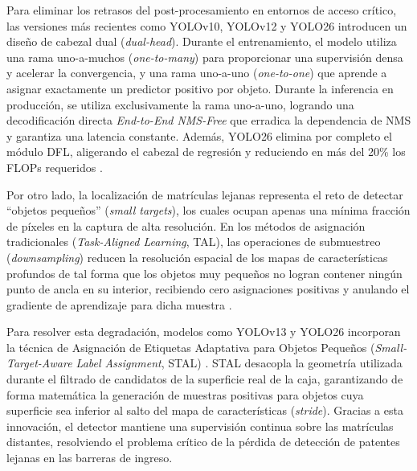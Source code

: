 Para eliminar los retrasos del post-procesamiento en entornos de acceso crítico,
las versiones más recientes como YOLOv10, YOLOv12 y YOLO26
\cite{wang2024yolov1to10, tian2025yolov12_arxiv, sapkota2026yolo26} introducen
un diseño de cabezal dual (\textit{dual-head}). Durante el entrenamiento, el
modelo utiliza una rama uno-a-muchos (\textit{one-to-many}) para proporcionar
una supervisión densa y acelerar la convergencia, y una rama uno-a-uno
(\textit{one-to-one}) que aprende a asignar exactamente un predictor positivo
por objeto. Durante la inferencia en producción, se utiliza exclusivamente la
rama uno-a-uno, logrando una decodificación directa \textit{End-to-End NMS-Free}
que erradica la dependencia de NMS y garantiza una latencia constante. Además,
YOLO26 elimina por completo el módulo DFL, aligerando el cabezal de regresión y
reduciendo en más del 20\% los FLOPs requeridos \cite{jocher2026yolo26}.

Por otro lado, la localización de matrículas lejanas representa el reto de
detectar ``objetos pequeños'' (\textit{small targets}), los cuales ocupan apenas
una mínima fracción de píxeles en la captura de alta resolución. En los métodos
de asignación tradicionales (\textit{Task-Aligned Learning}, TAL), las
operaciones de submuestreo (\textit{downsampling}) reducen la resolución
espacial de los mapas de características profundos de tal forma que los objetos
muy pequeños no logran contener ningún punto de ancla en su interior, recibiendo
cero asignaciones positivas y anulando el gradiente de aprendizaje para dicha
muestra \cite{jocher2026yolo26}.

Para resolver esta degradación, modelos como YOLOv13 y YOLO26 incorporan la
técnica de Asignación de Etiquetas Adaptativa para Objetos Pequeños
(\textit{Small-Target-Aware Label Assignment}, STAL) \cite{lei2025yolov13,
sapkota2026yolo26}. STAL desacopla la geometría utilizada durante el filtrado de
candidatos de la superficie real de la caja, garantizando de forma matemática la
generación de muestras positivas para objetos cuya superficie sea inferior al
salto del mapa de características (\textit{stride}). Gracias a esta innovación,
el detector mantiene una supervisión continua sobre las matrículas distantes, 
resolviendo el problema crítico de la pérdida de detección de patentes lejanas
en las barreras de ingreso.
